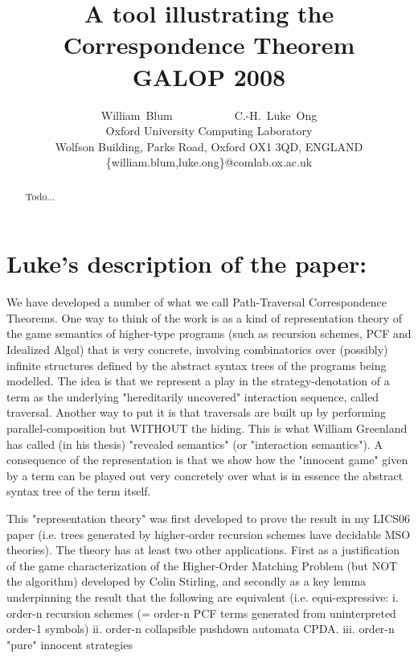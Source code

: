 


\title{A tool illustrating the Correspondence Theorem
\\ GALOP 2008}

\author{William~Blum~~~~~~~~~~~C.-H.~Luke~Ong\\
Oxford University Computing Laboratory\\
Wolfson Building, Parks Road, Oxford OX1 3QD, ENGLAND\\
\{william.blum,luke.ong\}@comlab.ox.ac.uk }




\maketitle \thispagestyle{empty}

\begin{abstract}
Todo...
\end{abstract}


\section{Luke's description of the paper:}

 We have developed a number of what we call Path-Traversal
Correspondence Theorems. One way to think of the work is as a kind
of representation theory of the game semantics of higher-type
programs (such as recursion schemes, PCF and Idealized Algol) that
is very concrete, involving combinatorics over (possibly) infinite
structures defined by the abstract syntax trees of the programs
being modelled. The idea is that we represent a play in the
strategy-denotation of a term as the underlying "hereditarily
uncovered" interaction sequence, called traversal. Another way to
put it is that traversals are built up by performing
parallel-composition but WITHOUT the hiding. This is what William
Greenland has called (in his thesis) "revealed semantics" (or
"interaction semantics"). A consequence of the representation is
that we show how the "innocent game" given by a term can be played
out very concretely over what is in essence the abstract syntax tree
of the term itself.

This "representation theory" was first developed to prove the result
in my LICS06 paper (i.e. trees generated by higher-order recursion
schemes have decidable MSO theories). The theory has at least two
other applications. First as a justification of the game
characterization of the Higher-Order Matching Problem (but NOT the
algorithm) developed by Colin Stirling, and secondly as a key lemma
underpinning the result that
 the following are equivalent (i.e. equi-expressive:
i. order-n recursion schemes (= order-n PCF terms generated from
uninterpreted order-1 symbols) ii. order-n collapsible pushdown
automata CPDA. iii. order-n "pure" innocent strategies

